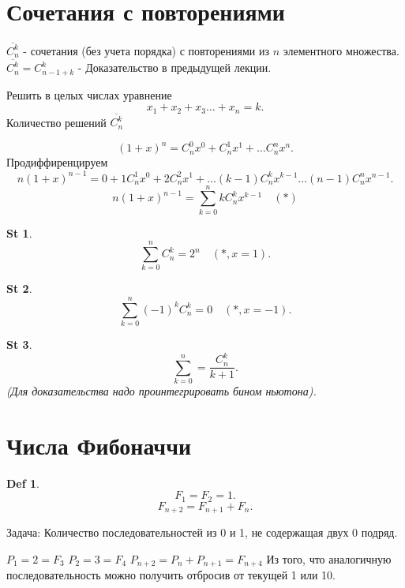 \documentclass[a5paper, 10pt]{article}
\theoremstyle{plain}
\newtheorem*{statement}{St}
\newtheorem{definition}{Def}
\begin{document}
    \section{Сочетания с повторениями}

    $ \overline{C_n^k} $ - сочетания (без учета порядка) с повторениями из $ n $ элементного множества.
    $ \overline{C_n^k} = C _{n - 1 + k}^k $ - Доказательство в предыдущей лекции.

    Решить в целых числах уравнение
    \[
        x_1 + x_2 + x_3 \dots + x_n = k
    .\]
    Количество решений $ \overline{ C_n^k } $

    \[
        (1 + x)^n =
            C_n^0 x^0 +
            C_n^1 x^1 +
            \dots
            C_n^n x^n
    .\]
    Продиффиренцируем
    \[
        n(1 + x)^{n-1} =
            0 +
            1 C_n^1 x^0 +
            2 C_n^2 x^1 +
            \dots
            (k - 1) C_n^k x^{k - 1}
            \dots
            (n - 1) C_n^n x^{n - 1}
    .\]
    \[
        n(1 + x)^{n-1} =
            \sum_{k = 0}^{n} k C_n^k x^{k-1} \quad (*)
    \]

     \begin{statement}
        \[
            \sum_{k = 0}^{n} C_n^k = 2^n \quad (*, x = 1)
        .\]
    \end{statement}

    \begin{statement}
        \[
            \sum_{k = 0}^{n} (-1)^k C_n^k = 0 \quad (*, x = -1)
        .\]
    \end{statement}

    \begin{statement}
        \[
            \sum_{k = 0}^{n} = \frac{C_n^k}{k + 1}
        .\]
        (Для доказательства надо проинтегрировать бином ньютона).
    \end{statement}

    \section{Числа Фибоначчи}

    \begin{definition}
        \[
            F_1 = F_2 = 1
        .\]
        \[
            F_{n+2} = F_{n+1} + F_n
        .\]
    \end{definition}

    Задача: Количество последовательностей из 0 и 1, не содержащая двух 0 подряд.

    \noindent
    $ P_1 = 2 = F_3 $ \newline
    $ P_2 = 3 = F_4 $ \newline
    $ P_{n+2} = P_n + P_{n+1} = F_{n+4} $ \newline
    Из того, что аналогичную последовательность можно получить отбросив от текущей 1 или 10.
\end{document}
